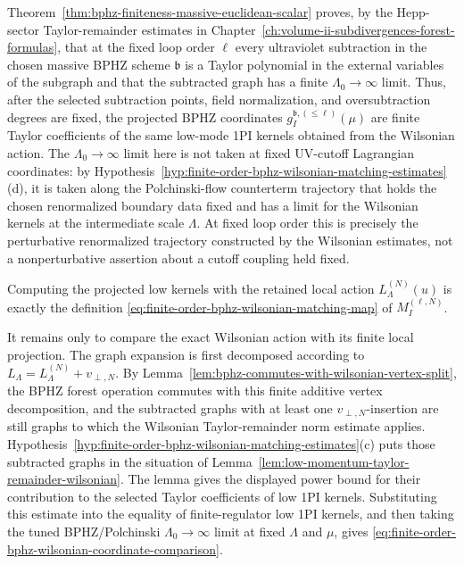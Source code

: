 Theorem~\ref{thm:bphz-finiteness-massive-euclidean-scalar} proves, by the
Hepp-sector Taylor-remainder estimates in
Chapter~\ref{ch:volume-ii-subdivergences-forest-formulas}, that at the fixed
loop order \(\ell\) every ultraviolet subtraction in the chosen massive BPHZ
scheme \(\mathfrak b\) is a Taylor polynomial in the external variables of
the subgraph and that the subtracted graph has a finite
\(\Lambda_0\to\infty\) limit.  Thus, after the selected subtraction points,
field normalization, and oversubtraction degrees are fixed, the projected
BPHZ coordinates \(g_I^{\mathfrak b,(\leq\ell)}(\mu)\) are finite Taylor
coefficients of the same low-mode 1PI kernels obtained from the Wilsonian
action.  The \(\Lambda_0\to\infty\) limit here is not taken at fixed
UV-cutoff Lagrangian coordinates: by
Hypothesis~\ref{hyp:finite-order-bphz-wilsonian-matching-estimates}\textup{(d)},
it is taken along the
Polchinski-flow counterterm trajectory that holds the chosen renormalized
boundary data fixed and has a limit for the Wilsonian kernels at the
intermediate scale \(\Lambda\).  At fixed loop order this is precisely the
perturbative renormalized trajectory constructed by the Wilsonian estimates,
not a nonperturbative assertion about a cutoff coupling held fixed.

Computing the projected low kernels with the retained local action
\(L_\Lambda^{(N)}(u)\) is exactly the definition
\eqref{eq:finite-order-bphz-wilsonian-matching-map} of
\(M_I^{(\ell,N)}\).

It remains only to compare the exact Wilsonian action with its finite local
projection.  The graph expansion is first decomposed according to
\(L_\Lambda=L_\Lambda^{(N)}+v_{\perp,N}\).  By
Lemma~\ref{lem:bphz-commutes-with-wilsonian-vertex-split}, the BPHZ forest
operation commutes with this finite additive vertex decomposition, and the
subtracted graphs with at least one \(v_{\perp,N}\)-insertion are still graphs
to which the Wilsonian Taylor-remainder norm estimate applies.
Hypothesis~\ref{hyp:finite-order-bphz-wilsonian-matching-estimates}\textup{(c)}
puts those subtracted graphs in the situation of
Lemma~\ref{lem:low-momentum-taylor-remainder-wilsonian}.  The lemma gives the
displayed power bound for their contribution to the selected Taylor
coefficients of low 1PI kernels.  Substituting this estimate into the equality
of finite-regulator low 1PI kernels, and then taking the tuned
BPHZ/Polchinski \(\Lambda_0\to\infty\) limit at fixed \(\Lambda\) and
\(\mu\), gives
\eqref{eq:finite-order-bphz-wilsonian-coordinate-comparison}.

